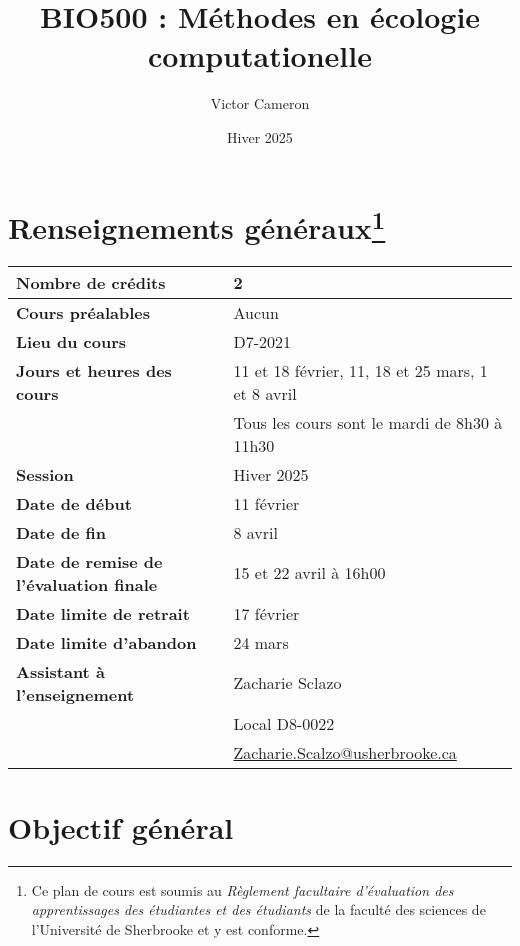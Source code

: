 \documentclass[12]{article}
\title{BIO500 : Méthodes en écologie computationelle}
\date {Hiver 2025}
\author {Victor Cameron}
\affil {Département de biologie \\
Université de Sherbrooke \\ 
Local D8-0012 \\ 
819-821-8000 \#61928}
\affil {\url{victor.cameron@usherbrooke.ca}}
\begin{document}
	\maketitle

	\section*{Renseignements généraux\footnote{Ce plan de cours est soumis au \textit{Règlement facultaire d'évaluation des apprentissages des étudiantes et des étudiants} de la faculté des sciences de l'Université de Sherbrooke et y est conforme.}} 
        
        \begin{center}
			\begin{tabular}{ m{22em} m{24em} }
				\hline
				\hline
				\textbf{Nombre de crédits} & 2 \\ 
				\hline
				\textbf{Cours préalables} & Aucun \\
				\hline
				\textbf{Lieu du cours} & D7-2021 \\
				\hline
				\textbf{Jours et heures des cours} & 11 et 18 février, 11, 18 et 25 mars, 1 et 8 avril \\ & Tous les cours sont le mardi de 8h30 à 11h30 \\
				\hline
				\textbf{Session} & Hiver 2025 \\
				\hline
				\textbf{Date de début} & 11 février \\
				\hline
				\textbf{Date de fin} & 8 avril \\
				\hline
				\textbf{Date de remise de l'évaluation finale} & 15 et 22 avril à 16h00 \\
				\hline
				\textbf{Date limite de retrait} & 17 février \\
				\hline
				\textbf{Date limite d'abandon} & 24 mars \\
				\hline
				\textbf{Assistant à l'enseignement} & Zacharie Sclazo \\ & Local D8-0022 \\ & \url{Zacharie.Scalzo@usherbrooke.ca} \\
				\hline
				\hline
			\end{tabular}
        \end{center}

	\section*{Objectif général}
\end{document}
